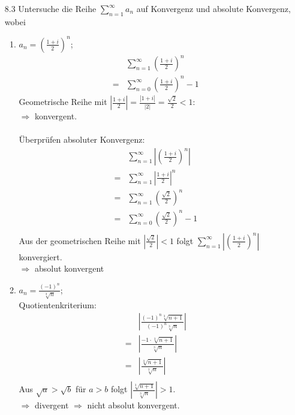 \documentclass{HM}
\begin{document}
\begin{enumerate}
\item[8.3] Untersuche die Reihe $\sum\limits_{n=1}^\infty a_n$ auf Konvergenz und absolute Konvergenz, wobei\\
\begin{enumerate}

\item $a_n=\left(\frac{1+i}{2}\right)^n$;
\begin{align*}
 	&\sum\limits_{n=1}^\infty\left(\frac{1+i}{2}\right)^n\\
	=&\sum\limits_{n=0}^\infty\left(\frac{1+i}{2}\right)^n-1
\end{align*}
Geometrische Reihe mit $|\frac{1+i}{2}| = \frac{|1+i|}{|2|} = \frac{\sqrt{2}}{2} < 1$:\\
$\Rightarrow$ konvergent.\\\\
Überprüfen absoluter Konvergenz:\\
\begin{align*}
	&\sum\limits_{n=1}^\infty\left|\left(\frac{1+i}{2}\right)^n\right|\\
	=&\sum\limits_{n=1}^\infty\left|\frac{1+i}{2}\right|^n\\
	=&\sum\limits_{n=1}^\infty\left(\frac{\sqrt{2}}{2}\right)^n\\
	=&\sum\limits_{n=0}^\infty\left(\frac{\sqrt{2}}{2}\right)^n-1\\
\end{align*}
Aus der geometrischen Reihe mit $|\frac{\sqrt{2}}{2}| < 1$ folgt $\sum\limits_{n=1}^\infty\left|\left(\frac{1+i}{2}\right)^n\right|$ konvergiert.\\
$\Rightarrow$ absolut konvergent\\

\item $a_n=\frac{(-1)^n}{\sqrt[3]{n}}$;\\
Quotientenkriterium:
\begin{align*}
	&\left|\frac{(-1)^n\sqrt[3]{n+1}}{(-1)^n\sqrt[3]{n}}\right|\\
	=&\left|\frac{-1\cdot\sqrt[3]{n+1}}{\sqrt[3]{n}}\right|\\
	=&\left|\frac{\sqrt[3]{n+1}}{\sqrt[3]{n}}\right|\\
\end{align*}
Aus $\sqrt{a}>\sqrt{b}$ für $a>b$ folgt $\left|\frac{\sqrt[3]{n+1}}{\sqrt[3]{n}}\right|>1$.\\
$\Rightarrow$ divergent $\Rightarrow$ nicht absolut konvergent.\\


\end{enumerate}
\end{enumerate}
\end{document}
